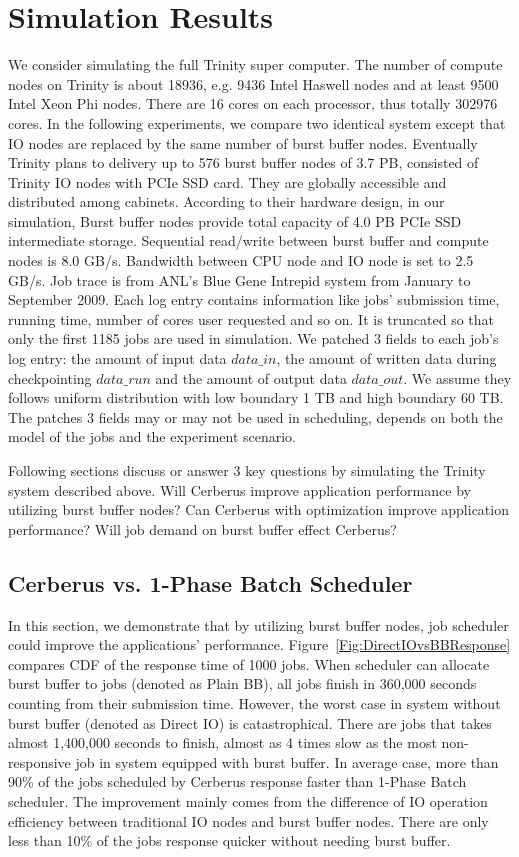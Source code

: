 \section{Simulation Results}
We consider simulating the full Trinity super computer\cite{TrinitySystem}.
The number of compute nodes on Trinity is about 18936,
e.g. 9436 Intel Haswell nodes
and at least 9500 Intel Xeon Phi nodes.
There are 16 cores on each processor, thus totally 302976 cores.
In the following experiments, we compare two identical system except that
IO nodes are replaced by the same number of burst buffer nodes.
Eventually Trinity plans to delivery up to 576 burst buffer nodes of 3.7 PB,
consisted of Trinity IO nodes with PCIe SSD card.
They are globally accessible and distributed among cabinets.
According to their hardware design, in our simulation, 
Burst buffer nodes provide total capacity of 4.0 PB PCIe SSD intermediate storage.
Sequential read/write between burst buffer and compute nodes is 8.0 GB/s.
Bandwidth between CPU node and IO node is set to 2.5 GB/s.
Job trace is from ANL's Blue Gene Intrepid system from January to September 2009.
Each log entry contains information like jobs' submission time, running time,
number of cores user requested and so on. 
It is truncated so that only the first 1185 jobs are used in simulation.
We patched 3 fields to each job's log entry: the amount of input data $data\_in$,
the amount of written data during checkpointing $data\_run$ and the amount of output data $data\_out$.
We assume they follows uniform distribution with low boundary 1 TB and high boundary 60 TB.
The patches 3 fields may or may not be used in scheduling,
depends on both the model of the jobs and the experiment scenario.

Following sections discuss or answer 3 key questions by
simulating the Trinity system described above.
Will Cerberus improve application performance by utilizing burst buffer nodes?
Can Cerberus with optimization improve application performance?
Will job demand on burst buffer effect Cerberus?

\subsection{Cerberus vs. 1-Phase Batch Scheduler}
\label{Sec:Sim:DirectIOvsBB}
In this section, we demonstrate that by utilizing burst buffer nodes,
job scheduler could improve the applications' performance.
Figure~\ref{Fig:DirectIOvsBBResponse} compares CDF of the response time of 1000 jobs.
When scheduler can allocate burst buffer to jobs (denoted as Plain BB),
all jobs finish in 360,000 seconds counting from their submission time.
However, the worst case in system without burst buffer (denoted as Direct IO) is catastrophical.
There are jobs that takes almost 1,400,000 seconds to finish,
almost as 4 times slow as the most non-responsive job in system equipped with burst buffer.
In average case, more than 90\% of the jobs scheduled by Cerberus response faster than 1-Phase Batch scheduler.
The improvement mainly comes from the difference of IO operation efficiency between
traditional IO nodes and burst buffer nodes.
There are only less than 10\% of the jobs response quicker without needing burst buffer.


